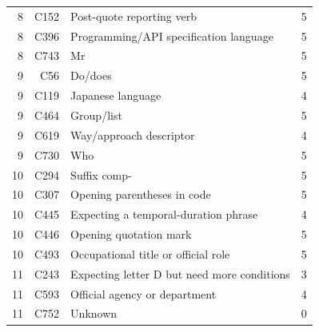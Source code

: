 \begin{tabular}{@{}rrp{}r@{}}
  8 & C152 & Post-quote reporting verb & 5 \\
  8 & C396 & Programming/API specification language & 5 \\
  8 & C743 & Mr & 5 \\
  9 & C56 & Do/does & 5 \\
  9 & C119 & Japanese language & 4 \\
  9 & C464 & Group/list & 5 \\
  9 & C619 & Way/approach descriptor & 4 \\
  9 & C730 & Who & 5 \\
  10 & C294 & Suffix comp- & 5 \\
  10 & C307 & Opening parentheses in code & 5 \\
  10 & C445 & Expecting a temporal-duration phrase & 4 \\
  10 & C446 & Opening quotation mark & 5 \\
  10 & C493 & Occupational title or official role & 5 \\
  11 & C243 & Expecting letter D but need more conditions & 3 \\
  11 & C593 & Official agency or department & 4 \\
  11 & C752 & Unknown & 0 \\
  \bottomrule
\end{tabular}
